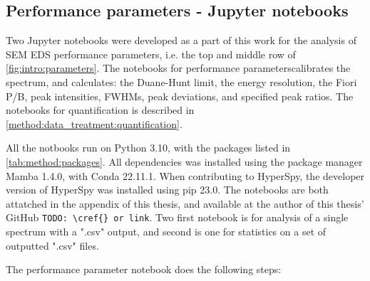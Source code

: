 \subsection{Performance parameters - Jupyter notebooks}
\label{method:data_treatment:notebook}

Two Jupyter notebooks were developed as a part of this work for the analysis of SEM EDS performance parameters, i.e. the top and middle row of \cref{fig:intro:parameters}.
The notebooks for performance parameterscalibrates the spectrum, and calculates: the Duane-Hunt limit, the energy resolution, the Fiori P/B, peak intensities, FWHMs, peak deviations, and specified peak ratios.
The notebooks for quantification is described in \cref{method:data_treatment:quantification}.


All the notbooks run on Python 3.10, with the packages listed in \cref{tab:method:packages}.
All dependencies was installed using the package manager Mamba 1.4.0, with Conda 22.11.1.
When contributing to HyperSpy, the developer version of HyperSpy was installed using pip 23.0.
The notebooks are both attatched in the appendix of this thesis, and available at the author of this thesis' GitHub \verb|TODO: \cref{} or link|.
Two first notebook is for analysis of a single spectrum with a ".csv" output, and second is one for statistics on a set of outputted ".csv" files.






The performance parameter notebook does the following steps:

